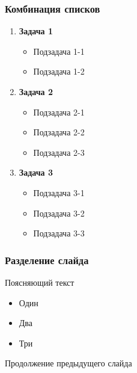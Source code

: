 \begin{frame}
    \frametitle{Комбинация списков}
    \begin{enumerate}[beginpenalty=10000, midpenalty=10000, wide=\parindent, leftmargin=0pt]
        \item \textbf{Задача 1}
              \begin{itemize}[beginpenalty=10000, midpenalty=10000, wide=\parindent, leftmargin=0pt]
                  \item Подзадача 1-1
                  \item Подзадача 1-2
              \end{itemize}
        \item \textbf{Задача 2}
              \begin{itemize}[beginpenalty=10000, midpenalty=10000, wide=\parindent, leftmargin=0pt]
                  \item Подзадача 2-1
                  \item Подзадача 2-2
                  \item Подзадача 2-3
              \end{itemize}
        \item \textbf{Задача 3}
              \begin{itemize}[beginpenalty=10000, midpenalty=10000, wide=\parindent, leftmargin=0pt]
                  \item Подзадача 3-1
                  \item Подзадача 3-2
                  \item Подзадача 3-3
              \end{itemize}
    \end{enumerate}
\end{frame}

\begin{frame}[allowframebreaks]
    \frametitle{Разделение слайда}
    Поясняющий текст
    \begin{itemize}[beginpenalty=10000, midpenalty=10000, wide=\parindent, leftmargin=0pt]
        \item Один
        \item Два
        \item Три
    \end{itemize}
    \framebreak
    Продолжение предыдущего слайда
\end{frame}

